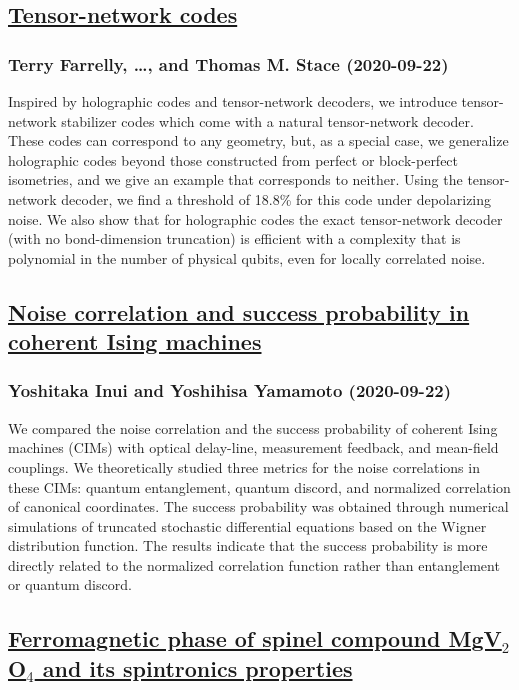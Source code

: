 {\subsection*{\href{http://arxiv.org/abs/2009.10329v1}{Tensor-network codes}}
\subsubsection*{Terry Farrelly, \dots, and Thomas M. Stace (2020-09-22)}
Inspired by holographic codes and tensor-network decoders, we introduce
tensor-network stabilizer codes which come with a natural tensor-network
decoder. These codes can correspond to any geometry, but, as a special case, we
generalize holographic codes beyond those constructed from perfect or
block-perfect isometries, and we give an example that corresponds to neither.
Using the tensor-network decoder, we find a threshold of 18.8\% for this code
under depolarizing noise. We also show that for holographic codes the exact
tensor-network decoder (with no bond-dimension truncation) is efficient with a
complexity that is polynomial in the number of physical qubits, even for
locally correlated noise.

\subsection*{\href{http://arxiv.org/abs/2009.10328v1}{Noise correlation and success probability in coherent Ising machines}}
\subsubsection*{Yoshitaka Inui and Yoshihisa Yamamoto (2020-09-22)}
We compared the noise correlation and the success probability of coherent
Ising machines (CIMs) with optical delay-line, measurement feedback, and
mean-field couplings. We theoretically studied three metrics for the noise
correlations in these CIMs: quantum entanglement, quantum discord, and
normalized correlation of canonical coordinates. The success probability was
obtained through numerical simulations of truncated stochastic differential
equations based on the Wigner distribution function. The results indicate that
the success probability is more directly related to the normalized correlation
function rather than entanglement or quantum discord.

\subsection*{\href{http://arxiv.org/abs/2009.10323v1}{Ferromagnetic phase of spinel compound MgV$_2$O$_4$ and its spintronics  properties}}
}
